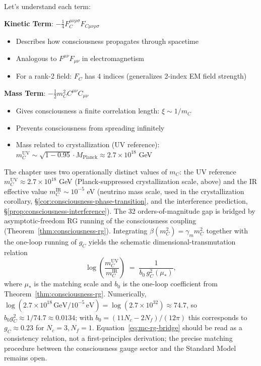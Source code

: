\begin{level2}
Let's understand each term:

\textbf{Kinetic Term}: $-\frac{1}{4}F^{\mu\nu\rho\sigma}_C F_{C\mu\nu\rho\sigma}$
\begin{itemize}
\item Describes how consciousness propagates through spacetime
\item Analogous to $F^{\mu\nu}F_{\mu\nu}$ in electromagnetism\cite{jackson1999,peskin1995}
\item For a rank-2 field: $F_{C}$ has 4 indices (generalizes 2-index EM field strength)
\end{itemize}

\textbf{Mass Term}: $-\frac{1}{2}m_C^2 C^{\mu\nu}C_{\mu\nu}$
\begin{itemize}
\item Gives consciousness a finite correlation length: $\xi \sim 1/m_C$
\item Prevents consciousness from spreading infinitely
\item Mass related to crystallization (UV reference): $m_C^{\text{UV}} \sim \sqrt{1 - 0.95} \cdot M_{\text{Planck}} \approx 2.7 \times 10^{18}$ GeV
\end{itemize}

\begin{remark}\label{rem:mc-uv-ir-bridge}
The chapter uses two operationally distinct values of $m_C$: the UV reference $m_C^{\text{UV}} \approx 2.7 \times 10^{18}$ GeV (Planck-suppressed crystallization scale, above) and the IR effective value $m_C^{\text{IR}} \sim 10^{-5}$ eV (neutrino mass scale, used in the crystallization corollary, \S\ref{cor:consciousness-phase-transition}, and the interference prediction, \S\ref{prop:consciousness-interference}). The 32 orders-of-magnitude gap is bridged by asymptotic-freedom RG running of the consciousness coupling (Theorem~\ref{thm:consciousness-rg}). Integrating $\beta(m_C^2) = \gamma_m m_C^2$ together with the one-loop running of $g_C$ yields the schematic dimensional-transmutation relation
\begin{equation}\label{eq:mc-rg-bridge}
\log\!\left(\frac{m_C^{\text{UV}}}{m_C^{\text{IR}}}\right) \;=\; \frac{1}{b_0\, g_C^2(\mu_*)},
\end{equation}
where $\mu_*$ is the matching scale and $b_0$ is the one-loop coefficient from Theorem~\ref{thm:consciousness-rg}. Numerically, $\log(2.7\times 10^{18}\,\text{GeV} / 10^{-5}\,\text{eV}) = \log(2.7\times 10^{32}) \approx 74.7$, so $b_0 g_C^2 \approx 1/74.7 \approx 0.0134$; with $b_0 = (11N_c - 2N_f)/(12\pi)$ this corresponds to $g_C \approx 0.23$ for $N_c = 3, N_f = 1$. Equation~\eqref{eq:mc-rg-bridge} should be read as a consistency relation, not a first-principles derivation; the precise matching procedure between the consciousness gauge sector and the Standard Model remains open.
\end{remark}


\end{level2}

